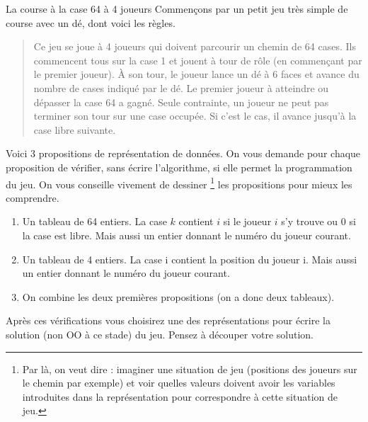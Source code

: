 \begin{Exercice}{La course à la case 64 à 4 joueurs}
	Commençons par un petit jeu très simple de course avec un dé, dont voici les règles.
	
	\begin{quote}
	\og Ce jeu se joue à 4 joueurs qui doivent parcourir un chemin de 64 cases.
	Ils commencent tous sur la case 1 et jouent à tour de rôle
	(en commençant par le premier joueur).
	À son tour, le joueur lance un dé à 6 faces 
	et avance du nombre de cases indiqué par le dé.
	Le premier joueur à atteindre ou dépasser la case 64 a gagné.
	Seule contrainte, un joueur ne peut pas terminer son tour
	sur une case occupée. 
	Si c'est le cas, il avance jusqu'à la case libre suivante.\fg
	\end{quote}
	
	Voici 3 propositions de représentation de données. 
	On vous demande pour chaque proposition de vérifier, 
	sans écrire l'algorithme, si elle permet la programmation du jeu. 
	On vous conseille vivement de \og{}dessiner\fg{}%
	\footnote{
		Par là, on veut dire : imaginer une situation de jeu
		(positions des joueurs sur le chemin par exemple)
		et voir quelles valeurs doivent avoir les variables
		introduites dans la représentation pour correspondre
		à cette situation de jeu. 
	} les propositions
	pour mieux les comprendre.
	
	\begin{enumerate}
	\item 
		Un tableau de 64 entiers.
		La case $k$ contient $i$ si le joueur $i$ s'y trouve 
		ou $0$ si la case est libre.
		Mais aussi un entier  donnant
		le numéro du joueur courant.
	\item
		Un tableau de 4 entiers. 
		La case i contient la position du joueur i.
		Mais aussi un entier  donnant
		le numéro du joueur courant.
	\item
		On combine les deux premières propositions
		(on a donc deux tableaux).
	\end{enumerate}

	Après ces vérifications vous choisirez une des représentations 
	pour écrire la solution (non OO à ce stade) du jeu.
	Pensez à découper votre solution.
	
\end{Exercice}
